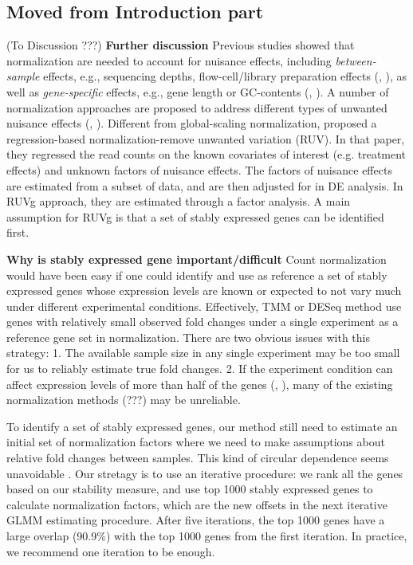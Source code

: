 \documentclass[11pt, a4paper]{article}
\begin{document}
\subsection{Moved from Introduction part}



(To Discussion ???) {\bf Further discussion} Previous studies showed that
normalization are needed to account for nuisance effects, including
\textit{between-sample} effects, e.g., sequencing depths, flow-cell/library
preparation effects (\cite{bullard2010evaluation},
\cite{robinson2010scaling}), as well as \textit{gene-specific} effects, e.g.,
gene length or GC-contents (\cite{risso2011gc}, \cite{hansen2012removing}). A
number of normalization approaches are proposed to address different types of
unwanted nuisance effects (\cite{dillies2013comprehensive},
\cite{risso2014nat}). Different from global-scaling normalization,
\cite{risso2014nat}  proposed a regression-based normalization-remove unwanted
variation (RUV).  In that paper, they regressed the read counts on the known
covariates of interest (e.g. treatment effects) and unknown factors of
nuisance effects. The factors of nuisance effects are estimated from a subset
of data, and are then adjusted for in DE analysis. In RUVg approach, they are
estimated through a factor analysis. A main assumption for RUVg is that a set
of stably expressed genes can be identified first.


\textbf{Why is stably expressed gene important/difficult} Count normalization would have been easy if one could identify and use as reference a set of stably expressed genes whose expression levels are known or expected to not vary much under different experimental conditions.  Effectively, TMM or DESeq method use genes with relatively small observed fold changes under a single experiment as a reference gene set in normalization. There are two obvious issues with this strategy: 1. The available sample size in any single experiment may be too small for us to reliably estimate true fold changes. 2. If the experiment condition can affect expression levels of more than half of the genes (\cite{loven2012revisiting}, \cite{wu2013use}), many of the existing normalization methods (???) may be unreliable.  


To identify a set of stably expressed genes, our method still need to estimate an initial set of normalization factors where we need to make assumptions about relative fold changes between samples. This kind of circular dependence seems unavoidable \citep{vandesompele2002accurate}. Our stretagy is to use an iterative procedure: we rank all the genes based on our stability measure, and use top 1000 stably expressed genes to calculate normalization factors, which are the new offsets in the next iterative GLMM estimating procedure. After five iterations, the top 1000 genes have a large overlap (90.9\%) with the top 1000 genes from the first iteration. In practice, we recommend one iteration to be enough.  
\end{document}
